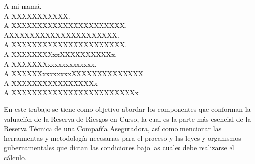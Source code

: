 \documentclass[11pt,twoside,openright,spanish]{report}
\numberwithin{equation}{chapter}
\numberwithin{figure}{chapter}
\numberwithin{table}{chapter}
\begin{document}
	\newpage
	$\ $
	\thispagestyle{empty} %
	
	\begin{acknowledgements}
		\doublespacing
		A mi mamá.
		\\
		
		\doublespacing
		A XXXXXXXXXXX.
		\\
		
		\doublespacing
		A XXXXXXXXXXXXXXXXXXXXXX.
		\\
		
		\doublespacing
		AXXXXXXXXXXXXXXXXXXXXX.
		\\
		
		\doublespacing
		A XXXXXXXXXXXXXXXXXXXXXX.
		\\
		
		\doublespacing
		A XXXXXXXXxxXXXXXXXXXXx.
		\\
		
		\doublespacing
		A XXXXXXXxxxxxxxxxxxxx.   
		\\
		
		\doublespacing
		A XXXXXXxxxxxxxxXXXXXXXXXXXXXX
		\\
		
		\doublespacing
		A XXXXXXXXXXXXXXXXx
		\\
		
		\doublespacing
		A XXXXXXXXXXXXXXXXXXXXXXXXx
		\\
		
		
	\end{acknowledgements}
	
	
	\tableofcontents
	
	
	\addtolength{\headheight}{\baselineskip}
	\pagestyle{fancy}
	\cleardoublepage
	
		\begin{comment}
	\begin{notation}
		\addcontentsline{toc}{chapter}{\numberline{}Notación}
		\pagenumbering{arabic}
		\doublespacing
		Que deberia incluir aqui?.
	\end{notation}
		\end{comment}
		
	\begin{preface}
		
		En este trabajo se tiene como objetivo abordar los componentes que conforman la valuación de la Reserva de Riesgos en Curso, la cual es la parte más esencial de la Reserva Técnica de una Compañía Aseguradora, así como mencionar las herramientas y metodología necesarias para el proceso y las leyes y organismos gubernamentales que dictan las condiciones bajo las cuales debe realizarse el cálculo.
		
	\end{preface}
	
\end{document}
